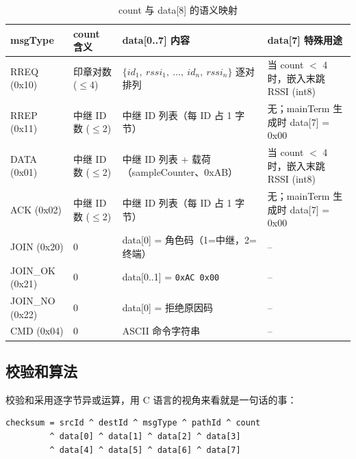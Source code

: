 \documentclass[12pt,a4paper]{ctexart}
\newcommand{\tblheaderstyle}{\sffamily\small\color{white}}
\begin{document}
\begin{table}[htbp]
\centering
\caption{count 与 data[8] 的语义映射}
\label{tab:countdata}
\begin{tabularx}{\textwidth}{l l >{\raggedright\arraybackslash}p{5.8cm} >{\raggedright\arraybackslash}X}
\toprule
\rowcolor{tblhead}\tblheaderstyle msgType & \tblheaderstyle count 含义 & \tblheaderstyle data[0..7] 内容 & \tblheaderstyle data[7] 特殊用途 \\
\midrule
RREQ (0x10) & 印章对数 ($\le$4) &
$\{id_1,\ rssi_1,\ \ldots,\ id_n,\ rssi_n\}$ 逐对排列 &
当 count $<$ 4 时，嵌入末跳 RSSI (int8) \\

RREP (0x11) & 中继 ID 数 ($\le$2) &
中继 ID 列表（每 ID 占 1 字节） &
无；mainTerm 生成时 data[7] = 0x00 \\

DATA (0x01) & 中继 ID 数 ($\le$2) &
中继 ID 列表 + 载荷（sampleCounter、0xAB） &
当 count $<$ 4 时，嵌入末跳 RSSI (int8) \\

ACK  (0x02) & 中继 ID 数 ($\le$2) &
中继 ID 列表（每 ID 占 1 字节） &
无；mainTerm 生成时 data[7] = 0x00 \\

JOIN (0x20) & 0 &
data[0] = 角色码（1=中继，2=终端） &
-- \\

JOIN\_OK (0x21) & 0 &
data[0..1] = \texttt{0xAC 0x00} &
-- \\

JOIN\_NO (0x22) & 0 &
data[0] = 拒绝原因码 &
-- \\

CMD  (0x04) & 0 &
ASCII 命令字符串 &
-- \\
\bottomrule
\end{tabularx}
\end{table}

\subsection{校验和算法}

校验和采用逐字节异或运算，用 C 语言的视角来看就是一句话的事：

\begin{lstlisting}[]
checksum = srcId ^ destId ^ msgType ^ pathId ^ count
         ^ data[0] ^ data[1] ^ data[2] ^ data[3]
         ^ data[4] ^ data[5] ^ data[6] ^ data[7]
\end{lstlisting}
\end{document}
